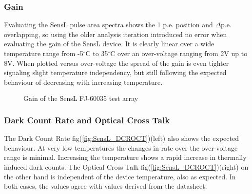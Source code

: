 \documentclass[12pt,article,type=msc,colorback,accentcolor=tud9c]{tudthesis}
\begin{document}
\begin{figure}[h]
\begin{centering}
}
\caption[SensL FJ60035 SiPM and average pulse shape]{SensL Test Array and the average pulse shape at $V_{bias-voltage} = 29V$}
\label{fig:SensL_Array_PS}
\end{centering}
\end{figure}


\subsubsection{Gain}
\label{subsubsec:SensLGain}

Evaluating the SensL pulse area spectra shows the 1 p.e. position and $\Delta$p.e. overlapping, so using the older analysis iteration introduced no error when evaluating the gain of the SensL device. It is clearly linear over a wide temperature range from -5$^\circ$C to 35$^\circ$C over an over-voltage ranging from 2V up to 8V. When plotted versus over-voltage the spread of the gain is even tighter signaling slight temperature independency, but still following the expected behaviour of decreasing with increasing temperature.

\begin{figure}[h!]
\begin{centering}
\caption[SensL FJ60035 gain]{Gain of the SensL FJ-60035 test array}
\label{fig:SensL_Gain}
\end{centering}
\end{figure}


\subsubsection{Dark Count Rate and Optical Cross Talk}
\label{subsubsec:SensL_DCROCT}
The Dark Count Rate fig(\ref{fig:SensL_DCROCT})(left) also shows the expected behaviour. At very low temperatures the changes in rate over the over-voltage range is minimal. Increasing the temperature shows a rapid increase in thermally induced dark counts. The Optical Cross Talk fig(\ref{fig:SensL_DCROCT})(right) on the other hand is independent of the device temperature, also as expected. In both cases, the values agree with values derived from the datasheet.
\end{document}
